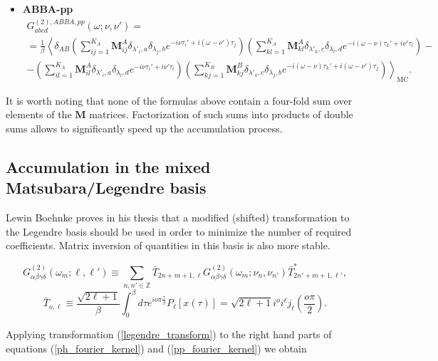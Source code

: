 \documentclass[a4paper,12pt]{article}
\renewcommand{\t}{\ensuremath{\tau}}
\newcommand{\w}{\ensuremath{\omega}}
\begin{document}
\begin{itemize}
	\item \textbf{ABBA-pp}
	\begin{multline}
	G^{(2),ABBA,pp}_{abcd}(\w;\nu,\nu') =\\= \frac{1}{\beta}\left\langle
		\delta_{AB}
		\left(\sum_{ij=1}^{K_A} \mathbf{M}^A_{ij}
			\delta_{\lambda'_i,a} \delta_{\lambda_j,b}
			e^{-i\nu\t_i'+i(\w-\nu')\t_j}
		\right)
		\left(\sum_{kl=1}^{K_A} \mathbf{M}^A_{kl}
			\delta_{\lambda'_k,c} \delta_{\lambda_l,d}
			e^{-i(\w-\nu)\t_k'+i\nu'\t_l}
		\right) -\right.\\\left.-
		\left(\sum_{il=1}^{K_A} \mathbf{M}^A_{il}
			\delta_{\lambda'_i,a} \delta_{\lambda_l,d}
			e^{-i\nu\t_i'+i\nu'\t_l}
		\right)
		\left(\sum_{kj=1}^{K_B} \mathbf{M}^B_{kj}
			\delta_{\lambda'_k,c} \delta_{\lambda_j,b}
			e^{-i(\w-\nu)\t_k'+i(\w-\nu')\t_j}
		\right)
		\right\rangle_\mathrm{MC}.
	\end{multline}
\end{itemize}

It is worth noting that none of the formulas above contain a four-fold sum
over elements of the $\mathbf{M}$ matrices. Factorization of such sums
into products of double sums allows to significantly speed up the accumulation
process.

\subsection{Accumulation in the mixed Matsubara/Legendre basis}

Lewin Boehnke proves in his thesis \cite{Boehnke15} that a modified (shifted)
transformation to the Legendre basis should be used in order to minimize the
number of required coefficients. Matrix inversion of quantities in this basis
is also more stable.

\begin{equation}\label{legendre_transform}
	G^{(2)}_{\alpha\beta\gamma\delta}(\w_m;\ell,\ell') \equiv
	\sum_{n,n'\in\mathbb{Z}}
	\bar T_{2n+m+1,\ell}
	G^{(2)}_{\alpha\beta\gamma\delta}(\w_m;\nu_n,\nu_{n'})
	\bar T^*_{2n'+m+1,\ell'},
\end{equation}
\begin{equation}
	\bar T_{o,\ell} \equiv \frac{\sqrt{2\ell+1}}{\beta}
	\int_0^\beta d\t e^{io\pi\frac{\t}{\beta}} P_\ell[x(\t)] =
	\sqrt{2\ell+1}i^o i^\ell j_\ell\left(\frac{o\pi}{2}\right).
\end{equation}

Applying transformation (\ref{legendre_transform}) to the right hand parts of
equations (\ref{ph_fourier_kernel}) and (\ref{pp_fourier_kernel}) we obtain
\end{document}
